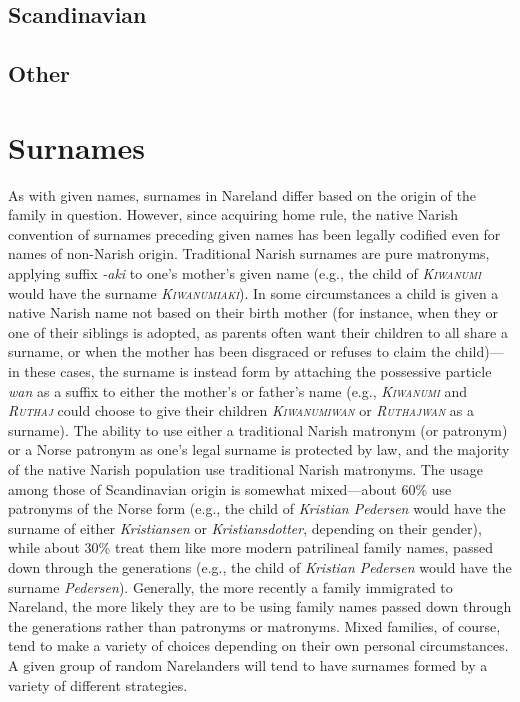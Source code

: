 \documentclass[a4paper,11pt,twoside,openright]{memoir}
\begin{document}
\subsection{Scandinavian}

\subsection{Other}

\section{Surnames}

As with given names, surnames in Nareland differ based on the origin of the family in question. However, since acquiring home rule, the native Narish convention of surnames preceding given names has been legally codified even for names of non-Narish origin. Traditional Narish surnames are pure matronyms, applying suffix \textit{-aki} to one's mother's given name (e.g., the child of \textit{\textsc{Kiwanumi}} would have the surname \textsc{\textit{Kiwanumiaki}}). In some circumstances a child is given a native Narish name not based on their birth mother (for instance, when they or one of their siblings is adopted, as parents often want their children to all share a surname, or when the mother has been disgraced or refuses to claim the child)---in these cases, the surname is instead form by attaching the possessive particle \textit{wan} as a suffix to either the mother's or father's name (e.g., \textsc{\textit{Kiwanumi}} and \textsc{\textit{Ruthaj}} could choose to give their children \textit{\textsc{Kiwanumiwan}} or \textit{\textsc{Ruthajwan}} as a surname). The ability to use either a traditional Narish matronym (or patronym) or a Norse patronym as one's legal surname is protected by law, and the majority of the native Narish population use traditional Narish matronyms. The usage among those of Scandinavian origin is somewhat mixed---about 60\% use patronyms of the Norse form (e.g., the child of \textit{Kristian Pedersen} would have the surname of either \textit{Kristiansen} or \textit{Kristiansdotter}, depending on their gender), while about 30\% treat them like more modern patrilineal family names, passed down through the generations (e.g., the child of \textit{Kristian Pedersen} would have the surname \textit{Pedersen}). Generally, the more recently a family immigrated to Nareland, the more likely they are to be using family names passed down through the generations rather than patronyms or matronyms. Mixed families, of course, tend to make a variety of choices depending on their own personal circumstances. A given group of random Narelanders will tend to have surnames formed by a variety of different strategies.
\end{document}
